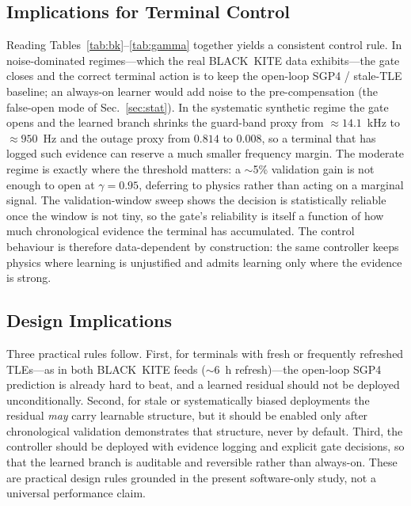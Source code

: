 \documentclass[conference]{IEEEtran}
\begin{document}
\subsection{Implications for Terminal Control}
\label{sec:implications}
Reading Tables~\ref{tab:bk}--\ref{tab:gamma} together yields a consistent control
rule. In noise-dominated regimes---which the real BLACK~KITE data exhibits---the
gate closes and the correct terminal action is to keep the open-loop SGP4 /
stale-TLE baseline; an always-on learner would add noise to the
pre-compensation (the false-open mode of Sec.~\ref{sec:stat}). In the systematic
synthetic regime the gate opens and the learned branch shrinks the guard-band
proxy from $\approx 14.1$~kHz to $\approx 950$~Hz and the outage proxy from
$0.814$ to $0.008$, so a terminal that has logged such evidence can reserve a
much smaller frequency margin. The moderate regime is exactly where the threshold
matters: a $\sim$5\% validation gain is not enough to open at $\gamma=0.95$,
deferring to physics rather than acting on a marginal signal. The
validation-window sweep shows the decision is statistically reliable once the
window is not tiny, so the gate's reliability is itself a function of how much
chronological evidence the terminal has accumulated. The control behaviour is
therefore data-dependent by construction: the same controller keeps physics where
learning is unjustified and admits learning only where the evidence is strong.

\subsection{Design Implications}
\label{sec:design}
Three practical rules follow. First, for terminals with fresh or frequently
refreshed TLEs---as in both BLACK~KITE feeds ($\sim$6~h refresh)---the open-loop
SGP4 prediction is already hard to beat, and a learned residual should not be
deployed unconditionally. Second, for stale or systematically biased deployments
the residual \emph{may} carry learnable structure, but it should be enabled only
after chronological validation demonstrates that structure, never by default.
Third, the controller should be deployed with evidence logging and explicit gate
decisions, so that the learned branch is auditable and reversible rather than
always-on. These are practical design rules grounded in the present software-only
study, not a universal performance claim.

\end{document}
